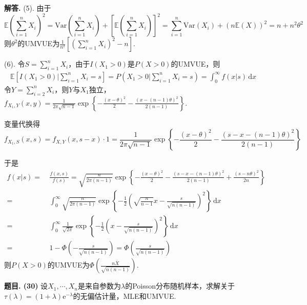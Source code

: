 \documentclass[12pt, a4paper, oneside]{ctexart}
\newcounter{problem}  %
\newenvironment{problem}[1][]{\stepcounter{problem}\par\noindent\textbf{题目\arabic{problem}. #1}}{\smallskip\par}
\newenvironment{solution}[1][]{\par\noindent\textbf{#1解答. }}{\smallskip\par}  %
\def\E{\mathbb{E}}          %
\def\var{\text{Var}}        %
\def\d{\mathrm{d}}          %
\def\e{\mathrm{e}}          %
\def\add{\vspace{1ex}}      %
\begin{document}
\begin{solution}
    (5). 由于
    \begin{equation*}
        \E\left(\sum_{i=1}^nX_i\right)^2 = \var\left(\sum_{i=1}^nX_i\right)+\left[\E\left(\sum_{i=1}^nX_i\right)\right]^2 = \sum_{i=1}^n\var(X_i)+(n\E(X))^2 = n+n^2\theta^2
    \end{equation*}
   则$\theta^2$的UMVUE为$\frac{1}{n^2}\left[\left(\sum_{i=1}^nX_i\right)^2-n\right]$.\add

    (6). 令$S  = \sum_{i=1}^nX_i$，由于$I(X_1>0)$是$P(X>0)$的UMVUE，则
    \begin{align*}
        \E\left[I(X_1>0)\biggl|\sum_{i=1}^nX_i=s\right] = P(X_1>0|\sum_{i=1}^nX_i=s) = \int_0^\infty f(x|s)\,\d x
    \end{align*}
    令$Y = \sum_{i=2}^nX_i$，则$Y$与$X_1$独立，$f_{X_1,Y}(x,y) = \frac{1}{2\pi\sqrt{n-1}}\exp\left\{-\frac{(x-\theta)^2}{2}-\frac{(x-(n-1)\theta)^2}{2(n-1)}\right\}$.\add

    变量代换得
    \begin{equation*}
        f_{X_1,S}(x,s) = f_{X,Y}(x,s-x)\cdot 1 = \frac{1}{2\pi\sqrt{n-1}}\exp\left\{-\frac{(x-\theta)^2}{2}-\frac{(s-x-(n-1)\theta)^2}{2(n-1)}\right\}
    \end{equation*}

    于是
    \begin{align*}
        f(x|s) =&\ \frac{f(x,s)}{f(s)} = \sqrt{\frac{n}{2\pi(n-1)}}\exp\left\{-\frac{(x-\theta)^2}{2}-\frac{(s-x-(n-1)\theta)^2}{2(n-1)}+\frac{(s-n\theta)^2}{2n}\right\}\\
        =&\ \int_0^\infty\sqrt{\frac{n}{2\pi(n-1)}}\exp\left\{-\frac{1}{2}\left(\sqrt{\frac{n}{n-1}}x-\frac{s}{\sqrt{n(n-1)}}\right)^2\right\}\,\d x\\
        =&\ \int_0^\infty\frac{1}{\sqrt{2\pi}}\exp\left\{-\frac{1}{2}\left(x-\frac{s}{\sqrt{n(n-1)}}\right)^2\right\}\,\d x\\
        =&\ 1-\Phi(-\frac{s}{\sqrt{n(n-1)}}) = \Phi(\frac{s}{\sqrt{n(n-1)}})
    \end{align*}
    则$P(X>0)$的UMVUE为$\Phi(\frac{n\bar{X}}{\sqrt{n(n-1)}})$.
\end{solution}
\begin{problem}[(30)]
    设$X_1,\cdots,X_n$是来自参数为$\lambda$的Poisson分布随机样本，求解关于$\tau(\lambda) = (1+\lambda)\e^{-\lambda}$的无偏估计量，MLE和UMVUE.
\end{problem}
\end{document}
